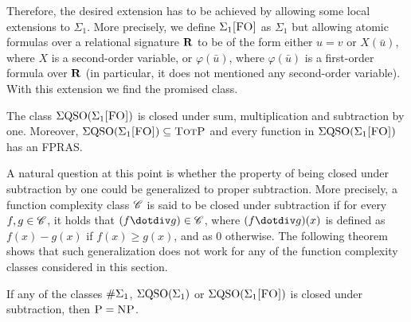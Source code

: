 Therefore, the desired extension has to be achieved by allowing some local extensions to $\Sigma_1$. More precisely, we define $\Sigma_{1}\textsc{[FO]}$ as $\Sigma_1$ but allowing atomic formulas over a relational signature $\mathbf{R}$ to be of the form either $u = v$ or $X(\bar u)$, where $X$ is a second-order variable, or $\varphi(\bar u)$, where $\varphi(\bar u)$ is a first-order formula over $\mathbf{R}$ (in particular, it does not mentioned any second-order variable). With this extension we find the promised class.
\begin{theorem}\label{sigmafo-minusone}
The class $\Sigma{\rm QSO}(\Sigma_{1}\textsc{[FO]})$ is closed under sum, multiplication and subtraction by one. Moreover, $\Sigma{\rm QSO}(\Sigma_{1}\textsc{[FO]}) \subseteq \text{\sc TotP}$ and every function in $\Sigma{\rm QSO}(\Sigma_{1}\textsc{[FO]})$ has an FPRAS.
\end{theorem}

A natural question at this point is whether the property of being closed under subtraction by one could be generalized to proper subtraction. More precisely, a function complexity class $\mathscr{C}$ is said to be closed under subtraction if for every $f,g \in \mathscr{C}$, it holds that $(f \dotdiv g) \in \CC$, where $(f \dotdiv g)(x)$ is defined as $f(x) - g(x)$ if $f(x) \geq g(x)$, and as $0$ otherwise. The following theorem shows that such generalization does not work for any of the function complexity classes considered in this section.
\begin{theorem} \label{sub-pnp}
If any of the classes $\#\Sigma_{1}$, $\Sigma{\rm QSO}(\Sigma_{1})$ or $\Sigma{\rm QSO}(\Sigma_{1}\textsc{[FO]})$ is closed under subtraction, then $\text{\sc P} = \text{\sc NP}$.
\end{theorem}

%



